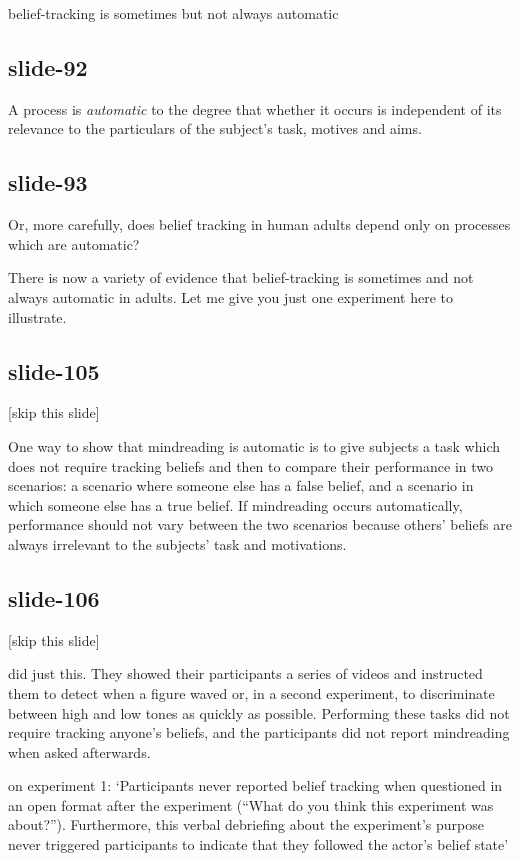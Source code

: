 \documentclass[12pt,\papersize]{extarticle}
\begin{document}
belief-tracking is sometimes  but not always   automatic

\subsection{slide-92}
A process is \emph{automatic} to the degree that whether it occurs is independent of its
relevance to the particulars of the subject's task, motives and aims.

\subsection{slide-93}
Or, more carefully, does belief tracking in human adults depend only
on processes which are automatic?

There is now a variety of evidence that belief-tracking is sometimes and
not always automatic in adults.  Let me give you just one experiment here
to illustrate.

\subsection{slide-105}
[skip this slide]

One way to show that mindreading is automatic is to give subjects a task which does not require tracking beliefs and then to compare their performance in two scenarios:
a scenario where someone else has a false belief, and a scenario in which someone else has a true belief.
If mindreading occurs automatically, performance should not vary between the two scenarios because others’ beliefs are always irrelevant to the subjects’ task and motivations.

\subsection{slide-106}
[skip this slide]

\citet{Schneider:2011fk} did just this.
They showed their participants a series of videos and instructed them to detect when a figure waved or, in a second experiment, to discriminate between high and low tones as quickly as possible.
Performing these tasks did not require tracking anyone’s beliefs, and the participants did not report mindreading when asked afterwards.

on experiment 1: ‘Participants never reported belief tracking when questioned in an open format after the experiment (“What do you think this experiment was about?”). Furthermore, this verbal debriefing about the experiment’s purpose never triggered participants to indicate that they followed the actor’s belief state’ \citep[p.~2]{Schneider:2011fk}
\end{document}
